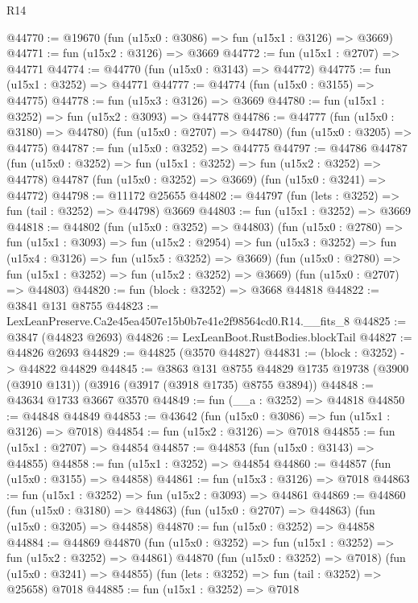 \begin{lexlean}{R14}
\begin{coremodule}
@44770 := @19670 (fun (u15x0 : @3086) => fun (u15x1 : @3126) => @3669)
@44771 := fun (u15x2 : @3126) => @3669
@44772 := fun (u15x1 : @2707) => @44771
@44774 := @44770 (fun (u15x0 : @3143) => @44772)
@44775 := fun (u15x1 : @3252) => @44771
@44777 := @44774 (fun (u15x0 : @3155) => @44775)
@44778 := fun (u15x3 : @3126) => @3669
@44780 := fun (u15x1 : @3252) => fun (u15x2 : @3093) => @44778
@44786 := @44777
    (fun (u15x0 : @3180) => @44780)
    (fun (u15x0 : @2707) => @44780)
    (fun (u15x0 : @3205) => @44775)
@44787 := fun (u15x0 : @3252) => @44775
@44797 := @44786
    @44787
    (fun (u15x0 : @3252) => fun (u15x1 : @3252) => fun (u15x2 : @3252) => @44778)
    @44787
    (fun (u15x0 : @3252) => @3669)
    (fun (u15x0 : @3241) => @44772)
@44798 := @11172 @25655
@44802 := @44797 (fun (lets : @3252) => fun (tail : @3252) => @44798) @3669
@44803 := fun (u15x1 : @3252) => @3669
@44818 := @44802
    (fun (u15x0 : @3252) => @44803)
    (fun (u15x0 : @2780) =>
    fun (u15x1 : @3093) =>
    fun (u15x2 : @2954) =>
    fun (u15x3 : @3252) => fun (u15x4 : @3126) => fun (u15x5 : @3252) => @3669)
    (fun (u15x0 : @2780) => fun (u15x1 : @3252) => fun (u15x2 : @3252) => @3669)
    (fun (u15x0 : @2707) => @44803)
@44820 := fun (block : @3252) => @3668 @44818
@44822 := @3841 @131 @8755
@44823 := LexLeanPreserve.Ca2e45ea4507e15b0b7e41e2f98564cd0.R14.__fits_8
@44825 := @3847 (@44823 @2693)
@44826 := LexLeanBoot.RustBodies.blockTail
@44827 := @44826 @2693
@44829 := @44825 (@3570 @44827)
@44831 := (block : @3252) -> @44822 @44829
@44845 := @3863
    @131
    @8755
    @44829
    @1735
    @19738
    (@3900 (@3910 @131))
    (@3916 (@3917 (@3918 @1735) @8755 @3894))
@44848 := @43634 @1733 @3667 @3570
@44849 := fun (__a : @3252) => @44818
@44850 := @44848 @44849
@44853 := @43642 (fun (u15x0 : @3086) => fun (u15x1 : @3126) => @7018)
@44854 := fun (u15x2 : @3126) => @7018
@44855 := fun (u15x1 : @2707) => @44854
@44857 := @44853 (fun (u15x0 : @3143) => @44855)
@44858 := fun (u15x1 : @3252) => @44854
@44860 := @44857 (fun (u15x0 : @3155) => @44858)
@44861 := fun (u15x3 : @3126) => @7018
@44863 := fun (u15x1 : @3252) => fun (u15x2 : @3093) => @44861
@44869 := @44860
    (fun (u15x0 : @3180) => @44863)
    (fun (u15x0 : @2707) => @44863)
    (fun (u15x0 : @3205) => @44858)
@44870 := fun (u15x0 : @3252) => @44858
@44884 := @44869
    @44870
    (fun (u15x0 : @3252) => fun (u15x1 : @3252) => fun (u15x2 : @3252) => @44861)
    @44870
    (fun (u15x0 : @3252) => @7018)
    (fun (u15x0 : @3241) => @44855)
    (fun (lets : @3252) => fun (tail : @3252) => @25658)
    @7018
@44885 := fun (u15x1 : @3252) => @7018

\end{coremodule}
\end{lexlean}

